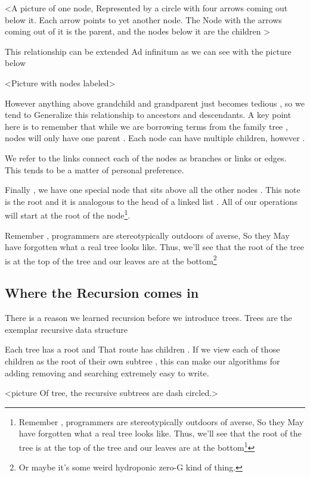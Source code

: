 \documentclass[10pt,a4paper]{book}
\begin{document}
<A picture of one node, Represented by a circle with four arrows coming out below it. Each arrow points to yet another node.  The Node with the arrows coming out of it is the parent, and the nodes below it are the children >


This relationship can be extended Ad infinitum as we can see with the picture below 


<Picture with nodes labeled>


However anything above grandchild and grandparent just becomes tedious , so we tend to  Generalize this relationship to ancestors and descendants.  A key point here is to remember that while we are borrowing terms from the family tree , nodes will only have one parent . Each node can have multiple children, however .


We refer to the links connect each of the nodes as branches or links or edges.  This tends to be a matter of personal preference.



Finally , we have one special node that sits above all the other nodes . This note is the root and it is analogous to the head of a linked list . All of our operations will start at the root of the node\footnote{Remember , programmers are stereotypically outdoors of averse, So they May have forgotten what a real tree looks like.  Thus, we'll see that the root of the tree is at the top of the tree and our leaves are at the bottom\footnote{Or maybe it's some weird hydroponic zero-G kind of thing.}}.


Remember , programmers are stereotypically outdoors of averse, So they May have forgotten what a real tree looks like.  Thus, we'll see that the root of the tree is at the top of the tree and our leaves are at the bottom\footnote{Or maybe it's some weird hydroponic zero-G kind of thing.}


\subsection{Where the  Recursion comes in}
There is a reason we learned recursion before we introduce trees. Trees are the exemplar recursive data structure

Each tree has a root and That route has children .  If we view each of those children as the root of their own subtree , this can make our algorithms for adding removing and searching extremely easy to write.

<picture Of tree, the recursive subtrees are dash circled.>
\end{document}
